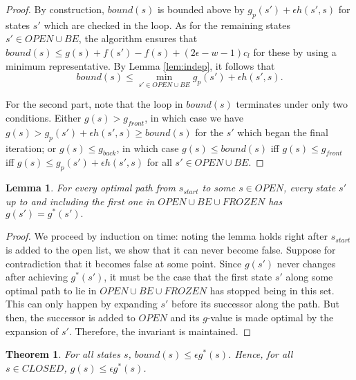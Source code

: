 \documentclass[letterpaper]{article}
\newtheorem{lemma}{Lemma}
\newtheorem{thm}{Theorem}
\begin{document}
\begin{proof}
By construction, $bound(s)$ is bounded above by $g_p(s') + \epsilon h(s',s)$ for states $s'$ which are checked in the loop. As for the remaining states $s' \in OPEN \cup BE$, the algorithm ensures that $bound(s) \le g(s) + f(s') - f(s) + (2\epsilon-w-1) c_l$ for these by using a minimum representative. By Lemma \ref{lem:indep}, it follows that
\[bound(s) \le \min_{s' \in OPEN \cup BE} g_p(s') + \epsilon h(s',s).\]

For the second part, note that the loop in $bound(s)$ terminates under only two conditions. Either $g(s) > g_{front}$, in which case we have $g(s) > g_p(s') + \epsilon h(s',s) \ge bound(s)$ for the $s'$ which began the final iteration; or $g(s) \le g_{back}$, in which case $g(s) \le bound(s)$ iff $g(s) \le g_{front}$ iff $g(s) \le g_p(s') + \epsilon h(s',s)$ for all $s' \in OPEN \cup BE$.
\end{proof}

\begin{lemma}
\label{lem:opt}
For every optimal path from $s_{start}$ to some $s\in OPEN$, every state $s'$ up to and including the first one in $OPEN \cup BE \cup FROZEN$ has $g(s') = g^*(s').$
\end{lemma}

\begin{proof}
We proceed by induction on time: noting the lemma holds right after $s_{start}$ is added to the open list, we show that it can never become false. Suppose for contradiction that it becomes false at some point. Since $g(s')$ never changes after achieving $g^*(s')$, it must be the case that the first state $s'$ along some optimal path to lie in $OPEN \cup BE \cup FROZEN$ has stopped being in this set. This can only happen by expanding $s'$ before its successor along the path. But then, the successor is added to $OPEN$ and its $g$-value is made optimal by the expansion of $s'$. Therefore, the invariant is maintained.
\end{proof}

\begin{thm}
\label{thm:subopt}
For all states $s$, $bound(s) \le \epsilon g^*(s)$. Hence, for all $s\in CLOSED$, $g(s) \le \epsilon g^*(s)$.
\end{thm}
\end{document}
